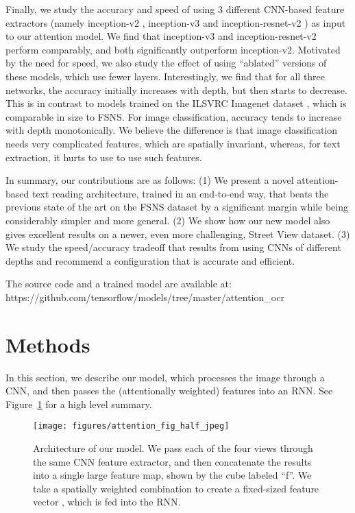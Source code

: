 \documentclass[conference]{IEEEtran}
\begin{document}
Finally, we study the accuracy and speed of
using 3 different CNN-based feature extractors
(namely   inception-v2 \cite{szegedy2015rethinking},
inception-v3 \cite{szegedy2016inception} and inception-resnet-v2
\cite{szegedy2016inception})
as input to our attention model.
We find that inception-v3 and inception-resnet-v2
perform comparably, and both significantly outperform
inception-v2.
Motivated by the need for speed,
we also study the effect of using ``ablated'' versions of these models,
which use fewer layers.
Interestingly, we find that for all three networks,
the accuracy initially increases with depth,
but then starts to decrease.
  This is in contrast to models trained on the ILSVRC Imagenet dataset
  \cite{ILSVRCarxiv14}, which is comparable in size to FSNS.
For image classification, accuracy tends to increase with depth monotonically.
We believe the difference is that image classification needs very complicated features, which are spatially invariant, whereas, for text extraction, it hurts to use to use such features.

In summary, our contributions are as follows:
(1) We present a novel attention-based text reading architecture, trained
in an end-to-end way, that beats the previous state of the art on the FSNS dataset
by a significant margin while being considerably simpler and more
general. (2) We show how our new model also gives excellent results on
a newer, even more challenging,  Street View dataset. 
(3) We study the speed/accuracy tradeoff that results from
using CNNs of different depths and recommend a
configuration that is accurate and efficient. 
 
The source code and a trained model are available at:\\
https://github.com/tensorflow/models/tree/master/attention\_ocr
 \section{Methods}

In this section, we describe our model, which processes the image
through a CNN, and then passes the (attentionally weighted) features
into an RNN. See Figure~\ref{fig:arch} for a high level summary.  

\begin{figure}
\begin{center}
\texttt{[image: figures/attention\_fig\_half\_jpeg]}
\caption{Architecture of our model.
  We pass each of the four views through the same CNN feature extractor, and then concatenate the results into a single large feature map, shown by the cube labeled ``f''. We take a spatially weighted combination to create a fixed-sized feature vector , which is fed into the RNN.
}
\label{fig:arch}
\end{center}
\end{figure}
\end{document}
